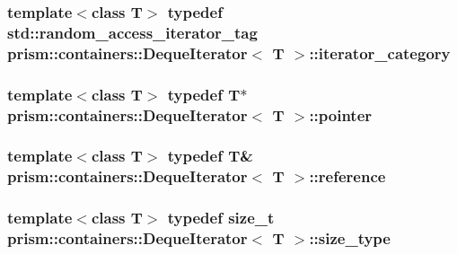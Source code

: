 \subsubsection[{\texorpdfstring{iterator\+\_\+category}{iterator_category}}]{\setlength{\rightskip}{0pt plus 5cm}template$<$class T$>$ typedef std\+::random\+\_\+access\+\_\+iterator\+\_\+tag {\bf prism\+::containers\+::\+Deque\+Iterator}$<$ T $>$\+::{\bf iterator\+\_\+category}}\hypertarget{classprism_1_1containers_1_1_deque_iterator_ada6e48b4bf97d304a24d65c1ec7df374}{}\label{classprism_1_1containers_1_1_deque_iterator_ada6e48b4bf97d304a24d65c1ec7df374}
\subsubsection[{\texorpdfstring{pointer}{pointer}}]{\setlength{\rightskip}{0pt plus 5cm}template$<$class T$>$ typedef T$\ast$ {\bf prism\+::containers\+::\+Deque\+Iterator}$<$ T $>$\+::{\bf pointer}}\hypertarget{classprism_1_1containers_1_1_deque_iterator_ab8852d168fc77cd5368dca9ab14e456a}{}\label{classprism_1_1containers_1_1_deque_iterator_ab8852d168fc77cd5368dca9ab14e456a}
\subsubsection[{\texorpdfstring{reference}{reference}}]{\setlength{\rightskip}{0pt plus 5cm}template$<$class T$>$ typedef T\& {\bf prism\+::containers\+::\+Deque\+Iterator}$<$ T $>$\+::{\bf reference}}\hypertarget{classprism_1_1containers_1_1_deque_iterator_a72100e9ee4840ecadaa96245732147d2}{}\label{classprism_1_1containers_1_1_deque_iterator_a72100e9ee4840ecadaa96245732147d2}
\subsubsection[{\texorpdfstring{size\+\_\+type}{size_type}}]{\setlength{\rightskip}{0pt plus 5cm}template$<$class T$>$ typedef size\+\_\+t {\bf prism\+::containers\+::\+Deque\+Iterator}$<$ T $>$\+::{\bf size\+\_\+type}}\hypertarget{classprism_1_1containers_1_1_deque_iterator_ab0c68bd1da836f6372247f4ba053e2ac}{}\label{classprism_1_1containers_1_1_deque_iterator_ab0c68bd1da836f6372247f4ba053e2ac}
